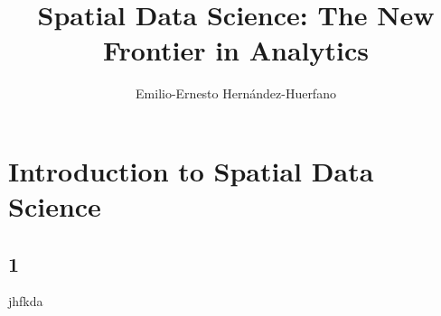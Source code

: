 \documentclass[10pt]{book}
\title{Spatial Data Science: The New Frontier in Analytics}
\author{Emilio-Ernesto Hernández-Huerfano}
\begin{document}
\maketitle

\chapter{Introduction to Spatial Data Science}
\section{1}
\noindent jhfkda
\end{document}
